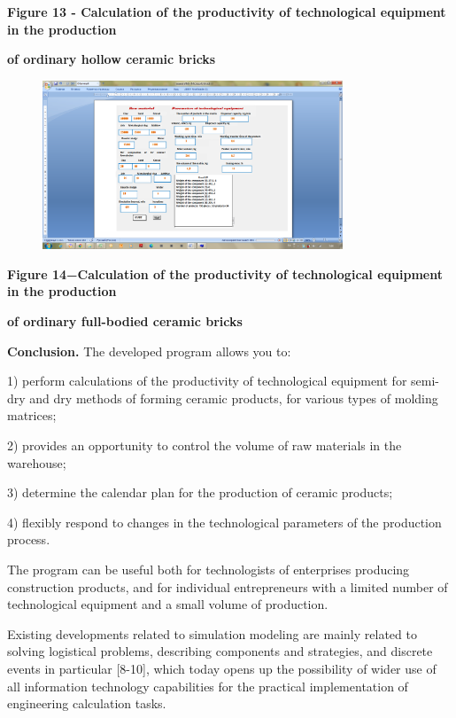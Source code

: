 {\bfseries Figure 13 - Calculation of the productivity of technological
equipment in the production}

{\bfseries of ordinary hollow ceramic bricks}

\begin{figure}[H]
	\centering
	\includegraphics[width=0.8\textwidth]{assets/280}
	\caption*{}
\end{figure}

{\bfseries Figure 14−Calculation of the productivity of technological
equipment in the production}

{\bfseries of ordinary full-bodied ceramic bricks}

{\bfseries Conclusion.} The developed program allows you to:

1) perform calculations of the productivity of technological equipment
for semi-dry and dry methods of forming ceramic products, for various
types of molding matrices;

2) provides an opportunity to control the volume of raw materials in the
warehouse;

3) determine the calendar plan for the production of ceramic products;

4) flexibly respond to changes in the technological parameters of the
production process.

The program can be useful both for technologists of enterprises
producing construction products, and for individual entrepreneurs with a
limited number of technological equipment and a small volume of
production.

Existing developments related to simulation modeling are mainly related
to solving logistical problems, describing components and strategies,
and discrete events in particular {[}8-10{]}, which today opens up the
possibility of wider use of all information technology capabilities for
the practical implementation of engineering calculation tasks.

